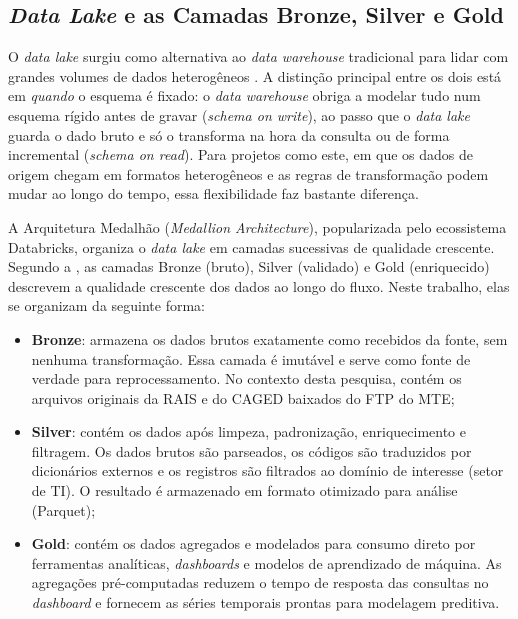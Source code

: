 \subsection{\textit{Data Lake} e as Camadas Bronze, Silver e Gold}

O \textit{data lake} surgiu como alternativa ao \textit{data warehouse} tradicional para lidar com grandes volumes de dados heterogêneos \cite{Reis2022}. A distinção principal entre os dois está em \textit{quando} o esquema é fixado: o \textit{data warehouse} obriga a modelar tudo num esquema rígido antes de gravar (\textit{schema on write}), ao passo que o \textit{data lake} guarda o dado bruto e só o transforma na hora da consulta ou de forma incremental (\textit{schema on read}). Para projetos como este, em que os dados de origem chegam em formatos heterogêneos e as regras de transformação podem mudar ao longo do tempo, essa flexibilidade faz bastante diferença.

A Arquitetura Medalhão (\textit{Medallion Architecture}), popularizada pelo ecossistema Databricks, organiza o \textit{data lake} em camadas sucessivas de qualidade crescente. Segundo a , as camadas Bronze (bruto), Silver (validado) e Gold (enriquecido) descrevem a qualidade crescente dos dados ao longo do fluxo. Neste trabalho, elas se organizam da seguinte forma:

\begin{itemize}
    \item \textbf{Bronze}: armazena os dados brutos exatamente como recebidos da fonte, sem nenhuma transformação. Essa camada é imutável e serve como fonte de verdade para reprocessamento. No contexto desta pesquisa, contém os arquivos originais da RAIS e do CAGED baixados do FTP do MTE;

    \item \textbf{Silver}: contém os dados após limpeza, padronização, enriquecimento e filtragem. Os dados brutos são parseados, os códigos são traduzidos por dicionários externos e os registros são filtrados ao domínio de interesse (setor de TI). O resultado é armazenado em formato otimizado para análise (Parquet);

    \item \textbf{Gold}: contém os dados agregados e modelados para consumo direto por ferramentas analíticas, \textit{dashboards} e modelos de aprendizado de máquina. As agregações pré-computadas reduzem o tempo de resposta das consultas no \textit{dashboard} e fornecem as séries temporais prontas para modelagem preditiva.
\end{itemize}

